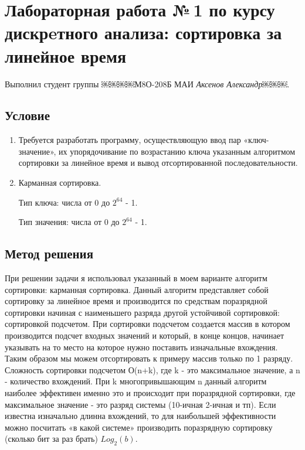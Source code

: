 \documentclass[12pt]{article}
\begin{document}
\section*{Лабораторная работа №\,1 по курсу дискрeтного анализа: сортировка за линейное время}

Выполнил студент группы ￼￼￼￼М8О-208Б МАИ \textit{Аксенов Александр￼￼￼}.

\subsection*{Условие}

\begin{enumerate}
\item Требуется разработать программу, осуществляющую ввод пар «ключ-значение»,
 их упорядочивание по возрастанию ключа указанным алгоритмом сортировки за линейное
 время и вывод отсортированной последовательности.
\item Карманная сортировка.

Тип ключа: числа от 0 до $2^{64}$ - 1.

Тип значения: числа от 0 до $2^{64}$ - 1. 
 
\end{enumerate}

\subsection*{Метод решения}

При решении задачи я использовал указанный в моем варианте алгоритм сортировки: карманная сортировка. Данный алгоритм представляет собой сортировку за линейное время и производится по средствам поразрядной сортировки начиная с наименьшего разряда другой устойчивой сортировкой: сортировкой подсчетом. При сортировки подсчетом создается массив в котором производится подсчет входных значений и который, в конце концов, начинает указывать на то место на которое нужно поставить изначальные вхождения. Таким образом мы можем отсортировать к примеру массив только по 1 разряду.  Сложность сортировки подсчетом О(n+k), где k -  это максимальное значение, а n - количество вхождений. При k многопривышающим n данный алгоритм наиболее эффективен именно это и происходит при поразрядной сортировки, где максимальное значение - это разряд системы (10-ичная 2-ичная и тп). Если известна изначально длинна вхождений, то для наибольшей эффективности можно посчитать «в какой системе» производить поразрядную сортировку (сколько бит за раз брать) $Log_2 (b)$.
\end{document}
